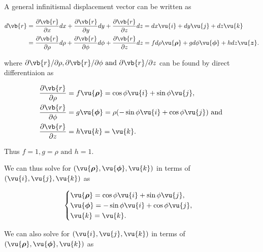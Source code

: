\documentclass[english,a4paper,12pt]{report}
\begin{document}
A general infinitismal displacement vector can be written as 

\begin{equation}
    \begin{aligned}
    d \vb{r} &= \frac{\partial \vb{r} }{\partial x} dx + \frac{\partial \vb{r} }{\partial y} dy + \frac{\partial \vb{r} }{\partial z} dz = dx \vu{i} + dy \vu{j} + dz \vu{k} \\ &= \frac{\partial \vb{r} }{\partial \rho } d\rho  + \frac{\partial \vb{r} }{\partial \phi  }d \phi  + \frac{\partial \vb{r} }{\partial z}d z =f d \rho  \vu{\boldsymbol{\rho } }  +g d\phi \vu{\boldsymbol{\phi  } } +h  d z\vu{\boldsymbol{z} }. 
    \end{aligned}
\end{equation}

where \(\partial \vb{r} / \partial \rho , \partial \vb{r} / \partial \phi  \text { and } \partial \vb{r} /\partial z  \) can be found by direct differentiaion as 

\begin{equation}
	\begin{aligned} 
		\frac{\partial \vb{r} }{\partial \rho }  &= f \vu{\boldsymbol{\rho } } = \cos{\phi}\vu{i} + \sin{\phi}\vu{j}, \\
		\frac{\partial \vb{r} }{\partial \phi }  &= g \vu{\boldsymbol{\phi } } = \rho (-\sin{\phi}\vu{i} + \cos{\phi}\vu{j}) \text { and }  \\
		\frac{\partial \vb{r} }{\partial z }  &= h \vu{k} = \vu{k}. 
	\end{aligned} 
\end{equation}

Thus \(f = 1, g = \rho  \text { and }  h = 1\). 

We can thus solve for \((\vu{\boldsymbol{\rho } }, \vu{\boldsymbol{\phi } }, \vu{k} )\) in terms of \((\vu{i} ,\vu{j} ,\vu{k} )\) as

\begin{equation}
    \begin{cases} 
        \vu{\boldsymbol{\rho } } = \cos \phi \vu{i} + \sin \phi \vu{j}, \\
        \vu{\boldsymbol{\phi } } = -\sin \phi \vu{i} + \cos \phi \vu{j}, \\
        \vu{k} = \vu{k}.
        \end{cases}
\end{equation}



We can also solve for \((\vu{i} , \vu{j}, \vu{k} )\) in terms of \((\vu{\boldsymbol{\rho } }, \vu{\boldsymbol{\phi } }, \vu{k} )\) as  
\end{document}
